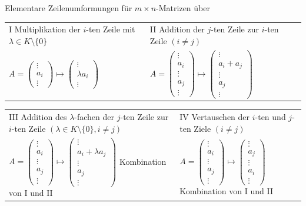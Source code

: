 \documentclass[12pt,a4paper]{article}
\theoremstyle{plain}
\numberwithin{equation}{section}
\begin{document}
Elementare Zeilenumformungen für $m\times n$-Matrizen über \\
\begin{tabular}{p{}p{}}
I Multiplikation der $i$-ten Zeile mit $\lambda \in K\setminus\{0\}$ & II Addition der $j$-ten Zeile zur $i$-ten Zeile $(i\neq j)$ \\
$A=\left(\begin{array}{c}
\vdots \\ a_i \\ \vdots
\end{array} \right) \mapsto \left(\begin{array}{c}
\vdots \\ \lambda a_i \\ \vdots
\end{array} \right)$ & $A=\left(\begin{array}{c}
\vdots \\ a_i \\ \vdots \\ a_j \\ \vdots
\end{array} \right) \mapsto \left(\begin{array}{c}
\vdots \\ a_i +a_j \\ \vdots \\ a_j \\ \vdots
\end{array} \right)$
\end{tabular}
\begin{tabular}{p{}p{}}
III Addition des $\lambda$-fachen der $j$-ten Zeile zur $i$-ten Zeile $(\lambda \in K\setminus\{0\}, i\neq j )$ & IV Vertauschen der $i$-ten und $j$-ten Ziele $(i\neq j)$\\
$A=\left(\begin{array}{c}
\vdots \\ a_i \\ \vdots \\ a_j \\ \vdots
\end{array} \right) \mapsto \left(\begin{array}{c}
\vdots \\ a_i +\lambda a_j \\ \vdots \\ a_j \\ \vdots
\end{array} \right)$ Kombination von I und II & $A=\left(\begin{array}{c}
\vdots \\ a_i \\ \vdots \\ a_j \\ \vdots
\end{array} \right) \mapsto \left(\begin{array}{c}
\vdots \\ a_j \\ \vdots \\ a_i \\ \vdots
\end{array} \right)$ Kombination von I und II
\end{tabular}
\end{document}
